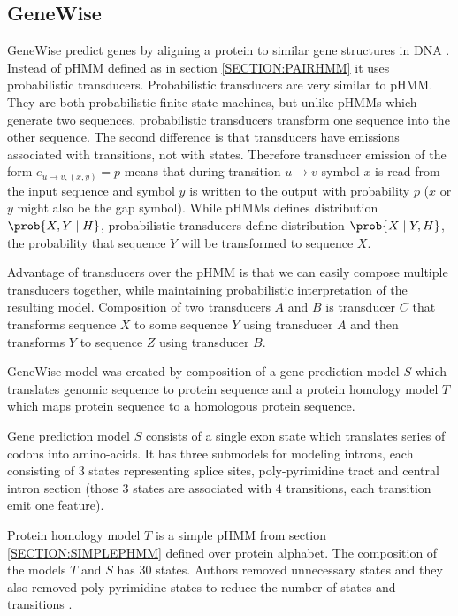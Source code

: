 \subsection{GeneWise}

GeneWise predict genes by aligning a protein  to similar gene structures in DNA
\cite{GeneWise2004}. Instead of pHMM defined as in section \ref{SECTION:PAIRHMM}
it uses probabilistic transducers. Probabilistic transducers are very similar to
pHMM. They are both probabilistic finite state machines, but unlike pHMMs which
generate two sequences, probabilistic transducers transform one sequence into
the other sequence.  The second difference is that transducers have emissions
associated with transitions, not with states.  Therefore transducer emission of
the form $e_{u\to v,(x,y)}=p$ means that during transition $u\to v$ symbol $x$
is read from the input sequence and symbol $y$ is written to the output with
probability $p$ ($x$ or $y$ might also be the gap symbol).  While pHMMs defines
distribution $\prob{X,Y\mid H}$, probabilistic transducers define distribution
$\prob{X\mid Y,H}$, the probability that sequence $Y$ will be transformed to
sequence $X$.

Advantage of transducers over the pHMM is that we can easily compose multiple
transducers together, while maintaining probabilistic interpretation of the
resulting model.  Composition of two transducers $A$ and $B$ is transducer $C$
that transforms sequence $X$ to some sequence $Y$ using transducer $A$ and then
transforms $Y$ to sequence $Z$ using transducer $B$. 

GeneWise model was created by composition of a gene prediction model $S$ which
translates genomic sequence to protein sequence and a protein homology model $T$
which maps protein sequence to a homologous protein sequence.

Gene prediction model $S$ consists of a single exon state which translates
series of codons into amino-acids. It has three submodels for modeling introns,
each consisting of $3$ states representing  splice sites, poly-pyrimidine tract
and central intron section (those $3$ states are associated with $4$
transitions, each transition emit one feature). 

Protein homology model $T$ is a simple pHMM from section \ref{SECTION:SIMPLEPHMM}
defined over protein alphabet.  The composition of the models $T$ and $S$ has
$30$ states. Authors removed unnecessary states and they also removed
poly-pyrimidine states to reduce the number of states and transitions
\cite{GeneWise2004}.


